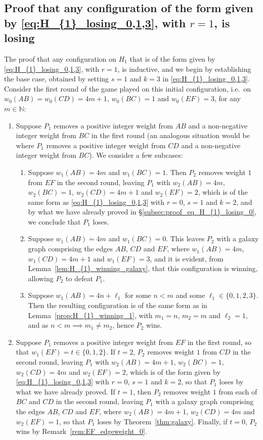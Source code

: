 \documentclass[11pt,reqno]{amsart}
\theoremstyle{definition}
\theoremstyle{definition}
\begin{document}
\subsection{Proof that any configuration of the form given by \eqref{eq:H_{1}_losing_0,1,3}, with $r=1$, is losing}\label{subsec:H_{1}_losing_1_proof}
The proof that any configuration on $H_{1}$ that is of the form given by \eqref{eq:H_{1}_losing_0,1,3}, with $r=1$, is inductive, and we begin by establishing the base case, obtained by setting $s=1$ and $k=3$ in \eqref{eq:H_{1}_losing_0,1,3}. Consider the first round of the game played on this initial configuration, i.e.\ on $w_{0}(AB)=w_{0}(CD)=4m+1$, $w_{0}(BC)=1$ and $w_{0}(EF)=3$, for any $m \in \mathbb{N}$:
\begin{enumerate}
\item Suppose $P_{1}$ removes a positive integer weight from $AB$ and a non-negative integer weight from $BC$ in the first round (an analogous situation would be where $P_{1}$ removes a positive integer weight from $CD$ and a non-negative integer weight from $BC$). We consider a few subcases:
\begin{enumerate}
\item Suppose $w_{1}(AB)=4m$ and $w_{1}(BC)=1$. Then $P_{2}$ removes weight $1$ from $EF$ in the second round, leaving $P_{1}$ with $w_{2}(AB)=4m$, $w_{2}(BC)=1$, $w_{2}(CD)=4m+1$ and $w_{2}(EF)=2$, which is of the same form as \eqref{eq:H_{1}_losing_0,1,3} with $r=0$, $s=1$ and $k=2$, and by what we have already proved in \S\ref{subsec:proof_eq_H_{1}_losing_0}, we conclude that $P_{1}$ loses.

\item Suppose $w_{1}(AB)=4m$ and $w_{1}(BC)=0$. This leaves $P_{2}$ with a galaxy graph comprising the edges $AB$, $CD$ and $EF$, where $w_{1}(AB)=4m$, $w_{1}(CD)=4m+1$ and $w_{1}(EF)=3$, and it is evident, from Lemma~\ref{lem:H_{1}_winning_galaxy}, that this configuration is winning, allowing $P_{2}$ to defeat $P_{1}$.

\item Suppose $w_{1}(AB)=4n+\ell_{1}$ for some $n < m$ and some $\ell_{1}\in\{0,1,2,3\}$. Then the resulting configuration is of the same form as in Lemma~\ref{prop:H_{1}_winning_1}, with $m_{1}=n$, $m_{2}=m$ and $\ell_{2}=1$, and as $n<m \implies m_{1} \neq m_{2}$, hence $P_{2}$ wins. 
\end{enumerate}

\item Suppose $P_{1}$ removes a positive integer weight from $EF$ in the first round, so that $w_{1}(EF)=t\in \{0,1,2\}$. If $t=2$, $P_{2}$ removes weight $1$ from $CD$ in the second round, leaving $P_{1}$ with $w_{2}(AB)=4m+1$, $w_{2}(BC)=1$, $w_{2}(CD)=4m$ and $w_{2}(EF)=2$, which is of the form given by \eqref{eq:H_{1}_losing_0,1,3} with $r=0$, $s=1$ and $k=2$, so that $P_{1}$ loses by what we have already proved. If $t=1$, then $P_{2}$ removes weight $1$ from each of $BC$ and $CD$ in the second round, leaving $P_{1}$ with a galaxy graph comprising the edges $AB$, $CD$ and $EF$, where $w_{2}(AB)=4m+1$, $w_{2}(CD)=4m$ and $w_{2}(EF)=1$, so that $P_{1}$ loses by Theorem~\ref{thm:galaxy}. Finally, if $t=0$, $P_{2}$ wins by Remark~\ref{rem:EF_edgeweight_0}.


\end{enumerate}
\end{document}
